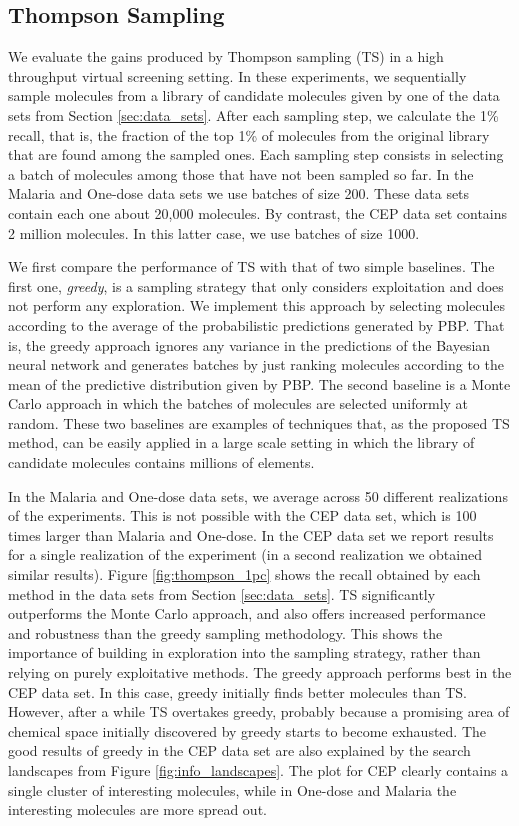 \subsection{Thompson Sampling}

We evaluate the gains produced by Thompson sampling (TS) in a high throughput virtual screening setting. In these experiments, we sequentially sample molecules from a library of candidate molecules given by one of the data sets from Section \ref{sec:data_sets}. After each sampling step, we calculate the 1\% recall, that is, the fraction of the top 1\% of molecules from the original library that are found among the sampled ones. Each sampling step consists in selecting a batch of molecules among those that have not been sampled so far. In the Malaria and One-dose data sets we use batches of size 200. These data sets contain each one about 20,000 molecules. By contrast, the CEP data set contains 2 million molecules. In this latter case, we use batches of size 1000. 

We first compare the performance of TS with that of two simple baselines. The first one, \emph{greedy}, is a sampling strategy that only considers exploitation and does not perform any exploration. We implement this approach by selecting molecules according to the average of the probabilistic predictions generated by PBP. That is, the greedy approach ignores any variance in the predictions of the Bayesian neural network and generates batches by just ranking molecules according to the mean of the predictive distribution given by PBP. The second baseline is a Monte Carlo approach in which the batches of molecules are selected uniformly at random. These two baselines are examples of techniques that, as the proposed TS method, can be easily applied in a large scale setting in which the library of candidate molecules contains millions of elements.

In the Malaria and One-dose data sets, we average across 50 different realizations of the experiments. This is not possible with the CEP data set, which is 100 times larger than Malaria and One-dose. In the CEP data set we report results for a single realization of the experiment (in a second realization we obtained similar results). 
Figure \ref{fig:thompson_1pc} shows the recall obtained by each method in the data sets from 
Section \ref{sec:data_sets}. TS significantly outperforms the Monte Carlo approach, and also offers increased performance and robustness than the greedy sampling methodology. This shows the importance of building in exploration into the sampling strategy, rather than relying on purely exploitative methods. The greedy approach performs best in the CEP data set. In this case, greedy initially finds better molecules than TS. However, after a while TS overtakes greedy, probably because a promising area of chemical space 
initially discovered by greedy starts to become exhausted. The good results of greedy in the CEP data set are also explained by the search landscapes from Figure \ref{fig:info_landscapes}. The plot for CEP clearly contains a single cluster of interesting molecules, while in One-dose and Malaria the interesting molecules are more spread out.

